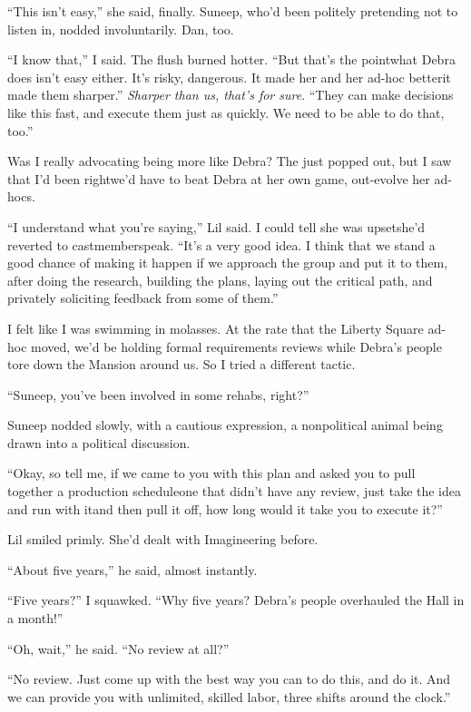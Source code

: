 “This isn't easy,” she said, finally. Suneep, who'd been politely
pretending not to listen in, nodded involuntarily. Dan, too.

“I know that,” I said. The flush burned hotter. “But that's the
point{\dash}what Debra does isn't easy either. It's risky, dangerous. It
made her and her ad-hoc better{\dash}it made them sharper.”
\emph{Sharper than us, that's for sure}. “They can make decisions
like this fast, and execute them just as quickly. We need to be
able to do that, too.”

Was I really advocating being more like Debra? The
 just
popped out, but I saw that I'd been right{\dash}we'd have to beat Debra
at her own game, out-evolve her ad-hocs.

“I understand what you're saying,” Lil said. I could tell she was
upset{\dash}she'd reverted to castmemberspeak. “It's a very good idea. I
think that we stand a good chance of making it happen if we
approach the group and put it to them, after doing the research,
building the plans, laying out the critical path, and privately
soliciting feedback from some of them.”

I felt like I was swimming in molasses. At the rate that the
Liberty Square ad-hoc moved, we'd be holding formal requirements
reviews while Debra's people tore down the Mansion around us. So I
tried a different tactic.

“Suneep, you've been involved in some rehabs, right?”

Suneep nodded slowly, with a cautious expression, a nonpolitical
animal being drawn into a political discussion.

“Okay, so tell me, if we came to you with this plan and asked you
to pull together a production schedule{\dash}one that didn't have any
review, just take the idea and run with it{\dash}and then pull it off,
how long would it take you to execute it?”

Lil smiled primly. She'd dealt with Imagineering before.

“About five years,” he said, almost instantly.

“Five years?” I squawked. “Why five years? Debra's people
overhauled the Hall in a month!”

“Oh, wait,” he said. “No review at all?”

“No review. Just come up with the best way you can to do this, and
do it. And we can provide you with unlimited, skilled labor, three
shifts around the clock.”

